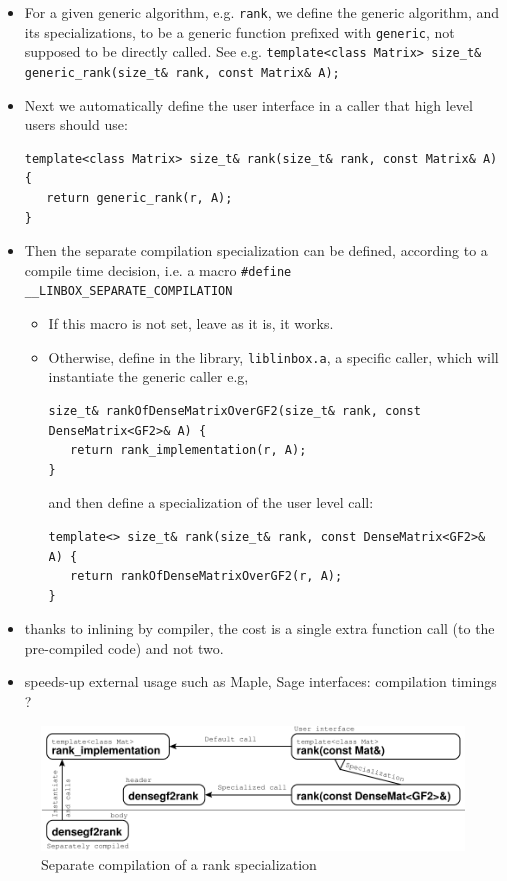 \documentclass[runningheads,a4paper]{llncs}
\begin{document}
\begin{itemize}
\item For a given generic algorithm, e.g. \verb!rank!, we define the
  generic algorithm, and its specializations, to be a generic function
  prefixed with \verb!generic!, not supposed to be directly called. See e.g. 
\verb!template<class Matrix> size_t& generic_rank(size_t& rank, const Matrix& A);!
\item Next we automatically define the user interface in a caller that
  high level users should use:
\begin{verbatim}
template<class Matrix> size_t& rank(size_t& rank, const Matrix& A) {
   return generic_rank(r, A);
}
\end{verbatim}
\item Then the separate compilation specialization can be defined,
  according to a compile time decision, i.e. a macro 
\verb!#define __LINBOX_SEPARATE_COMPILATION!
\begin{itemize}
\item If this macro is not set, leave as it is, it works.
\item Otherwise, define in the library, \verb!liblinbox.a!, 
a specific caller, which will instantiate the generic caller e.g,
\begin{verbatim}
size_t& rankOfDenseMatrixOverGF2(size_t& rank, const DenseMatrix<GF2>& A) {
   return rank_implementation(r, A);
}
\end{verbatim}
and then define a specialization of the user level call:
\begin{verbatim}
template<> size_t& rank(size_t& rank, const DenseMatrix<GF2>& A) {
   return rankOfDenseMatrixOverGF2(r, A);
}
\end{verbatim}
\end{itemize}
\end{itemize}

\begin{itemize}
\item thanks to inlining by compiler, the cost is a single extra
  function call (to the pre-compiled code) and not two.
\item speeds-up external usage such as Maple, Sage interfaces:
  compilation timings ?
\end{itemize}

\begin{figure}[ht]
\includegraphics[width=\textwidth]{separate}
\caption{Separate compilation of a rank specialization}\label{fig:sep}
\end{figure}



 
\end{document}
